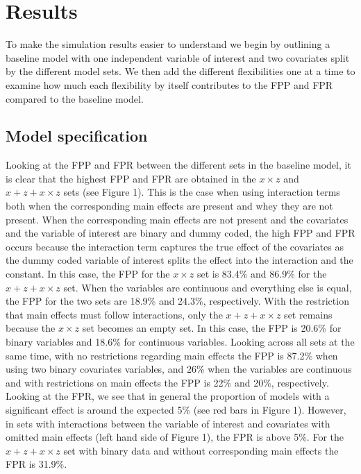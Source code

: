 \section{Results} 
To make the simulation results easier to understand we begin by outlining a baseline model with one independent  variable of interest and two covariates split by the different model sets. We then add the different flexibilities one at a time to examine how much each flexibility by itself contributes to the FPP and FPR compared to the baseline model.

\subsection{Model specification}
Looking at the FPP and FPR between the different sets in the baseline model, it is clear that the highest FPP and FPR are obtained in the $x \times z$ and $x + z+ x \times z$ sets (see Figure 1). This is the case when using interaction terms both when the corresponding main effects are present and whey they are not present. When the corresponding main effects are not present and the covariates and the variable of interest are binary and dummy coded, the high FPP and FPR occurs because the interaction term  captures the true effect of the covariates as the dummy coded variable of interest splits the effect into the interaction and the constant. In this case, the FPP for the $x \times z$ set is 83.4\% and 86.9\% for the $x + z+ x \times z$ set. When the variables are continuous and everything else is equal, the FPP for the two sets are 18.9\% and 24.3\%, respectively. With the restriction that main effects must follow interactions, only the $x + z+ x \times z$ set remains because the $x \times z$ set becomes an empty set. In this case, the FPP is 20.6\% for binary variables and 18.6\% for continuous variables. Looking across all sets at the same time, with no restrictions regarding main effects the FPP is 87.2\% when using two binary covariates variables, and 26\% when the variables are continuous and with restrictions on main effects the FPP is 22\% and 20\%, respectively.\\ 
Looking at the FPR, we see that in general the proportion of models with a significant effect is around the expected 5\%  (see red bars in Figure 1). However, in sets with interactions between the variable of interest and covariates with omitted main effects (left hand side of Figure 1), the FPR is above 5\%. For the $x + z+ x \times z$ set with binary data and without corresponding main effects the FPR is 31.9\%. \\

